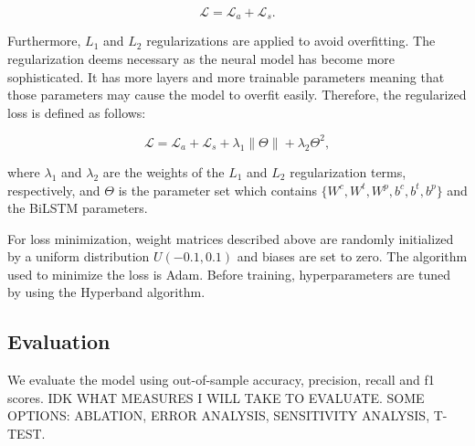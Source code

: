 \documentclass[american, oneside]{ecsgdp}
\begin{document}
\begin{equation}
    \mathcal{L} = \mathcal{L}_a + \mathcal{L}_s.
\end{equation}

Furthermore, $L_1$ and $L_2$ regularizations are applied to avoid overfitting. The regularization deems necessary as the neural model has become more sophisticated. It has more layers and more trainable parameters meaning that those parameters may cause the model to overfit easily. Therefore, the regularized loss is defined as follows:

\begin{equation}
    \mathcal{L} = \mathcal{L}_a + \mathcal{L}_s + \lambda_1 \|\Theta\| + \lambda_2  \Theta^2,
\end{equation}

\noindent where $\lambda_1$ and $\lambda_2$ are the weights of the $L_1$ and $L_2$ regularization terms, respectively, and $\Theta$ is the parameter set which contains $\{W^c, W^t, W^p, b^c, b^t, b^p\}$ and the BiLSTM parameters.

For loss minimization, weight matrices described above are randomly initialized by a uniform distribution $U(-0.1, 0.1)$ and biases are set to zero. The algorithm used to minimize the loss is Adam. %
Before training, hyperparameters are tuned by using the Hyperband algorithm. %


\subsection{Evaluation} \label{sec:evaluation}

We evaluate the model using out-of-sample accuracy, precision, recall and f1 scores. IDK WHAT MEASURES I WILL TAKE TO EVALUATE. SOME OPTIONS: ABLATION, ERROR ANALYSIS, SENSITIVITY ANALYSIS, T-TEST.


\end{document}
